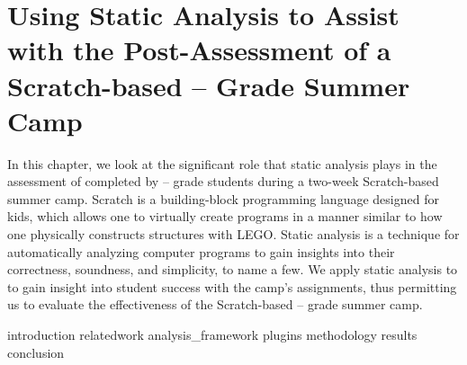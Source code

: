\chapter{Using Static Analysis to Assist with the Post-Assessment of a
  Scratch-based -- Grade Summer Camp}
\label{chap:hairball}

In this chapter, we look at the significant role that static analysis plays in
the assessment of  completed by -- grade students
during a two-week Scratch-based summer camp. Scratch is a building-block
programming language designed for kids, which allows one to virtually create
programs in a manner similar to how one physically constructs structures with
LEGO\textregistered{}. Static analysis is a technique for automatically
analyzing computer programs to gain insights into their correctness, soundness,
and simplicity, to name a few. We apply static analysis to  to gain
insight into student success with the camp's assignments, thus permitting us to
evaluate the effectiveness of the Scratch-based -- grade summer
camp.

\iffull
\def\currentprefix{hairball}
{introduction}
{relatedwork}
{analysis_framework}
{plugins}
{methodology}
{results}
{conclusion}
\fi
